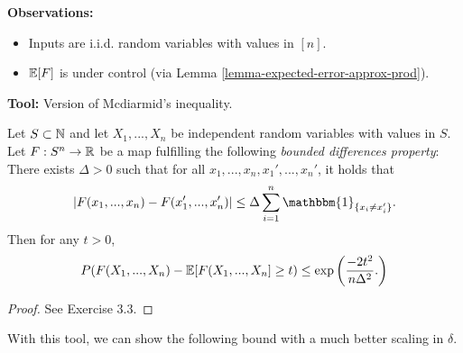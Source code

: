 \textbf{Observations:}%
\begin{itemize}[-,itemsep=0pt]
\item Inputs are i.i.d. random variables with values in $[n]$.
\item $\mathbb{E}[F]$ is under control (via Lemma \ref{lemma-expected-error-approx-prod}).
\end{itemize}
\textbf{Tool:} Version of Mcdiarmid's inequality. \\
\drawaline
{} \vspace{-1pc}
\begin{theorem} \label{theorem:mcdiarmid}
Let $S\subset \mathbb{N}$ and let $X_1,...,X_n$ be independent random variables with values in $S$. Let $F:S^n \to \mathbb{R}$ be a map fulfilling the following \emph{bounded differences property}: There exists $\Delta >0$ such that for all $x_1,...,x_n,x_1',...,x_n'$, it holds that
\begin{equation} \label{eq2.10:bounded-diff-prop}
|F(x_1,...,x_n) - F (x_1',...,x_n')| \leq \Delta \sum_{i=1}^n \mathbbm{1}_{\{x_i \neq x_i'\}}.
\end{equation}
Then for any $t>0$,
\begin{equation}
P(F(X_1,...,X_n) - \mathbb{E} [F(X_1,...,X_n] \geq t) \leq \exp \left(
\frac{-2t^2}{n\Delta^2}.
\right)
\end{equation}
\begin{proof}
See Exercise 3.3.
\end{proof}
\end{theorem}
With this tool, we can show the following bound with a much better scaling in $\delta$.

